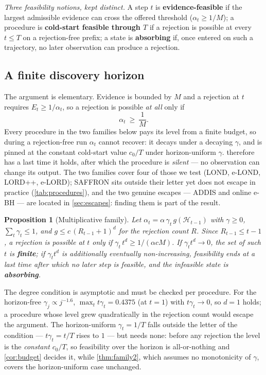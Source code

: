 \documentclass[conference]{IEEEtran}
\newtheorem{proposition}[theorem]{Proposition}
\newcommand{\ceil}{M}
\newcommand{\alphat}{\alpha_t}
\begin{document}
\emph{Three feasibility notions, kept distinct.} A step $t$ is \textbf{evidence-feasible} if the
largest admissible evidence can cross the offered threshold ($\alphat \ge 1/\ceil$); a procedure is
\textbf{cold-start feasible through $T$} if a rejection is possible at every $t \le T$ on a
rejection-free prefix; a state is \textbf{absorbing} if, once entered on such a trajectory,
no later observation can produce a rejection.

\subsection{A finite discovery horizon}

The argument is elementary. Evidence is bounded by $\ceil$ and a rejection at $t$ requires
$E_t \ge 1/\alphat$, so a rejection is possible \emph{at all} only if
\begin{equation}\label{eq:feas}
\alphat \ \ge\ \frac{1}{\ceil}.
\end{equation}
Every procedure in the two families below pays its level from a finite budget, so during a
rejection-free run $\alphat$ cannot recover: it decays under a decaying $\gamma$, and is pinned at the
constant cold-start value $c_0/T$ under horizon-uniform $\gamma$.  therefore has a last
time it holds, after which the procedure is \emph{silent} --- no observation can change its output. The two families cover four of those we test
(LOND, e-LOND, LORD++, e-LORD); SAFFRON sits outside their letter yet does not escape in practice
(\cref{tab:procedures}), and the two genuine escapes --- ADDIS and online e-BH --- are located in
\cref{sec:escapes}: finding them is part of the result.

\begin{proposition}[Multiplicative family]\label{thm:family1}
Let $\alphat = \alpha\,\gamma_t\,g(\mathcal{H}_{t-1})$ with $\gamma \ge 0$,
$\sum_t \gamma_t \le 1$, and $g \le c\,(R_{t-1}+1)^d$ for the rejection count $R$. Since
$R_{t-1} \le t-1$, a rejection is possible at $t$ only if
$\gamma_t\,t^{d} \ge 1/(\alpha c \ceil)$. If $\gamma_t t^{d} \to 0$, the set of such $t$ is
\textbf{finite}; if $\gamma_t t^{d}$ is additionally eventually non-increasing, feasibility ends
at a last time after which no later step is feasible, and the infeasible state is
\textbf{absorbing}.
\end{proposition}

The degree condition is asymptotic and must be checked per procedure. For the horizon-free
$\gamma_j \propto j^{-1.6}$, $\max_t t\gamma_t = 0.4375$ (at $t=1$) with $t\gamma_t \to 0$, so $d=1$
holds; a procedure whose level grew quadratically in the rejection count would escape the argument. The
horizon-uniform $\gamma_t = 1/T$ falls outside the letter of the condition --- $t\gamma_t = t/T$ rises
to $1$ --- but needs none: before any rejection the level is the \emph{constant} $c_0/T$, so
feasibility over the horizon is all-or-nothing and \cref{cor:budget} decides it, while
\cref{thm:family2}, which assumes no monotonicity of $\gamma$, covers the horizon-uniform case
unchanged.
\end{document}
